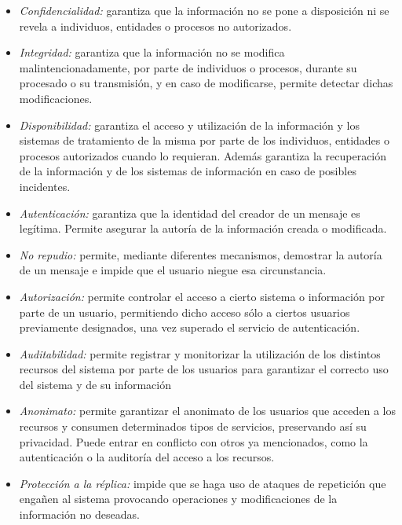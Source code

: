 \begin{itemize}
	\item \emph{Confidencialidad:} garantiza que la información no se pone a disposición ni se revela  a individuos, entidades o procesos no autorizados.
	\item \emph{Integridad:} garantiza que la información no se modifica malintencionadamente, por parte de individuos o procesos, durante su procesado o su transmisión, y en caso de modificarse, permite detectar dichas modificaciones.
	\item \emph{Disponibilidad:} garantiza el acceso y utilización de la información y los sistemas de tratamiento de la misma por parte de los individuos, entidades o procesos autorizados cuando lo requieran. Además garantiza la recuperación de la información y de los sistemas de información en caso de posibles incidentes.
\end{itemize}

\begin{itemize}
	\item \emph{Autenticación:} garantiza que la identidad del creador de un mensaje es legítima. Permite asegurar la autoría de la información creada o modificada.
	\item \emph{No repudio:} permite, mediante diferentes mecanismos, demostrar la autoría de un mensaje e impide que el usuario niegue esa circunstancia.
	\item \emph{Autorización:} permite controlar el acceso a cierto sistema o información por parte de un usuario, permitiendo dicho acceso sólo a ciertos usuarios previamente designados, una vez superado el servicio de autenticación. 
	\item \emph{Auditabilidad:} permite registrar y monitorizar la utilización de los distintos recursos del sistema por parte de los usuarios para garantizar el correcto uso del sistema y de su información
	\item \emph{Anonimato:} permite garantizar el anonimato de los usuarios que acceden a los recursos y consumen determinados tipos de servicios, preservando así su privacidad. Puede entrar en conflicto con otros ya mencionados, como la autenticación o la auditoría del acceso a los recursos.
	\item \emph{Protección a la réplica:} impide que se haga uso de ataques de repetición que engañen al sistema provocando operaciones y modificaciones de la información no deseadas.
\end{itemize}
